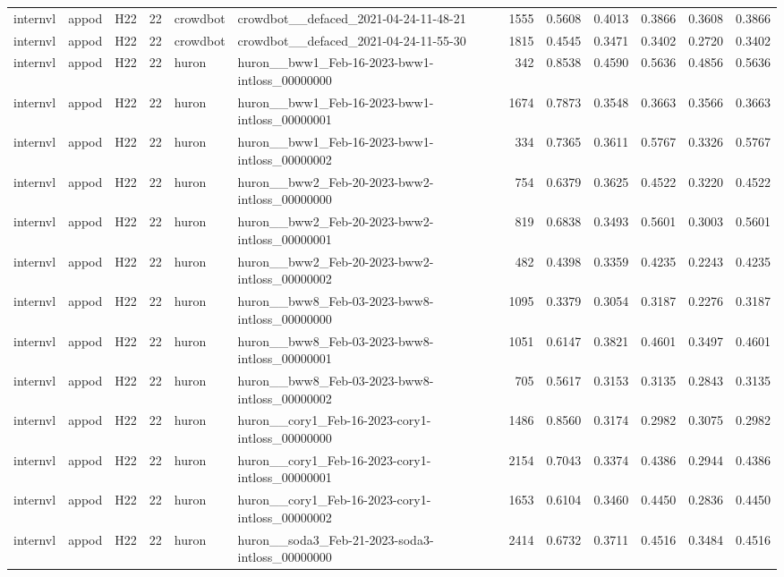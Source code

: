 \begin{table}[tbp]
\begin{tabular}{lllrllrrrrrr}
internvl & appod & H22 & 22 & crowdbot & crowdbot\_\_defaced\_2021-04-24-11-48-21 & 1555 & 0.5608 & 0.4013 & 0.3866 & 0.3608 & 0.3866 \\
internvl & appod & H22 & 22 & crowdbot & crowdbot\_\_defaced\_2021-04-24-11-55-30 & 1815 & 0.4545 & 0.3471 & 0.3402 & 0.2720 & 0.3402 \\
internvl & appod & H22 & 22 & huron & huron\_\_bww1\_Feb-16-2023-bww1-intloss\_00000000 & 342 & 0.8538 & 0.4590 & 0.5636 & 0.4856 & 0.5636 \\
internvl & appod & H22 & 22 & huron & huron\_\_bww1\_Feb-16-2023-bww1-intloss\_00000001 & 1674 & 0.7873 & 0.3548 & 0.3663 & 0.3566 & 0.3663 \\
internvl & appod & H22 & 22 & huron & huron\_\_bww1\_Feb-16-2023-bww1-intloss\_00000002 & 334 & 0.7365 & 0.3611 & 0.5767 & 0.3326 & 0.5767 \\
internvl & appod & H22 & 22 & huron & huron\_\_bww2\_Feb-20-2023-bww2-intloss\_00000000 & 754 & 0.6379 & 0.3625 & 0.4522 & 0.3220 & 0.4522 \\
internvl & appod & H22 & 22 & huron & huron\_\_bww2\_Feb-20-2023-bww2-intloss\_00000001 & 819 & 0.6838 & 0.3493 & 0.5601 & 0.3003 & 0.5601 \\
internvl & appod & H22 & 22 & huron & huron\_\_bww2\_Feb-20-2023-bww2-intloss\_00000002 & 482 & 0.4398 & 0.3359 & 0.4235 & 0.2243 & 0.4235 \\
internvl & appod & H22 & 22 & huron & huron\_\_bww8\_Feb-03-2023-bww8-intloss\_00000000 & 1095 & 0.3379 & 0.3054 & 0.3187 & 0.2276 & 0.3187 \\
internvl & appod & H22 & 22 & huron & huron\_\_bww8\_Feb-03-2023-bww8-intloss\_00000001 & 1051 & 0.6147 & 0.3821 & 0.4601 & 0.3497 & 0.4601 \\
internvl & appod & H22 & 22 & huron & huron\_\_bww8\_Feb-03-2023-bww8-intloss\_00000002 & 705 & 0.5617 & 0.3153 & 0.3135 & 0.2843 & 0.3135 \\
internvl & appod & H22 & 22 & huron & huron\_\_cory1\_Feb-16-2023-cory1-intloss\_00000000 & 1486 & 0.8560 & 0.3174 & 0.2982 & 0.3075 & 0.2982 \\
internvl & appod & H22 & 22 & huron & huron\_\_cory1\_Feb-16-2023-cory1-intloss\_00000001 & 2154 & 0.7043 & 0.3374 & 0.4386 & 0.2944 & 0.4386 \\
internvl & appod & H22 & 22 & huron & huron\_\_cory1\_Feb-16-2023-cory1-intloss\_00000002 & 1653 & 0.6104 & 0.3460 & 0.4450 & 0.2836 & 0.4450 \\
internvl & appod & H22 & 22 & huron & huron\_\_soda3\_Feb-21-2023-soda3-intloss\_00000000 & 2414 & 0.6732 & 0.3711 & 0.4516 & 0.3484 & 0.4516 \\

\end{tabular}
\end{table}
